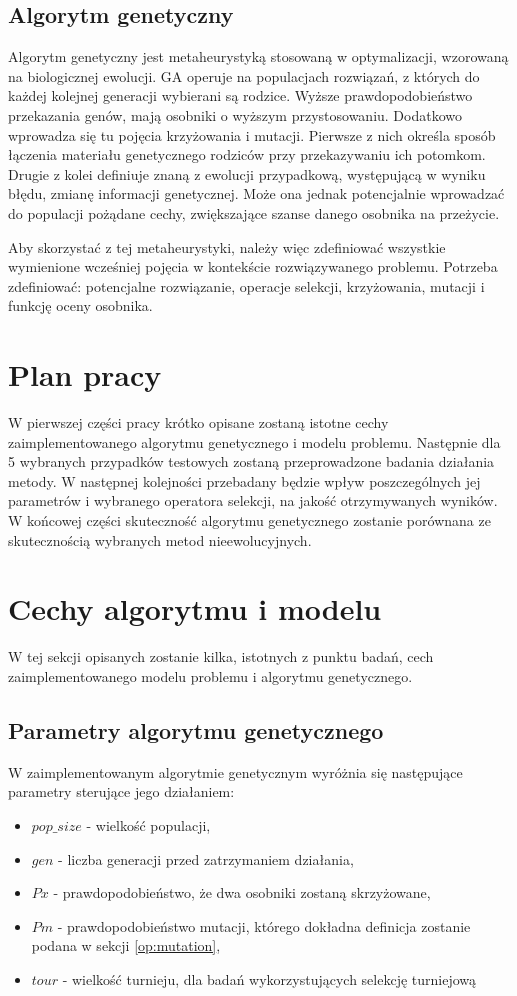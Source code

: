 \documentclass{article}
\begin{document}
	\subsection{Algorytm genetyczny}
	Algorytm genetyczny jest metaheurystyką stosowaną w optymalizacji, wzorowaną na biologicznej ewolucji. GA operuje na populacjach rozwiązań, z których do każdej kolejnej generacji wybierani są rodzice. Wyższe prawdopodobieństwo przekazania genów, mają osobniki o wyższym przystosowaniu. Dodatkowo wprowadza się tu pojęcia krzyżowania i mutacji. Pierwsze z nich określa sposób łączenia materiału genetycznego rodziców przy przekazywaniu ich potomkom. Drugie z kolei definiuje znaną z ewolucji przypadkową, występującą w wyniku błędu, zmianę informacji genetycznej.
	Może ona jednak potencjalnie wprowadzać do populacji pożądane cechy, zwiększające szanse danego osobnika na przeżycie. \par Aby skorzystać z tej metaheurystyki, należy więc zdefiniować wszystkie wymienione wcześniej pojęcia w kontekście rozwiązywanego problemu. Potrzeba zdefiniować: potencjalne rozwiązanie, operacje selekcji, krzyżowania, mutacji i funkcję oceny osobnika.
	
	\section{Plan pracy}
	W pierwszej części pracy krótko opisane zostaną istotne cechy zaimplementowanego algorytmu genetycznego i modelu problemu. Następnie dla 5 wybranych przypadków testowych zostaną przeprowadzone badania działania metody. W następnej kolejności przebadany będzie wpływ poszczególnych jej parametrów i wybranego operatora selekcji, na jakość otrzymywanych wyników. W końcowej części skuteczność algorytmu genetycznego zostanie porównana ze skutecznością wybranych metod nieewolucyjnych.
	
	\section{Cechy algorytmu i modelu}
	W tej sekcji opisanych zostanie kilka, istotnych z punktu badań, cech zaimplementowanego modelu problemu i algorytmu genetycznego.
	
	\subsection{Parametry algorytmu genetycznego}
	W zaimplementowanym algorytmie genetycznym wyróżnia się następujące parametry sterujące jego działaniem:
	\begin{itemize}
		\item $pop\_size$ - wielkość populacji,
		\item $gen$ - liczba generacji przed zatrzymaniem działania,
		\item $Px$ - prawdopodobieństwo, że dwa osobniki zostaną skrzyżowane,
		\item $Pm$ - prawdopodobieństwo mutacji, którego dokładna definicja zostanie podana w sekcji \ref{op:mutation},
		\item $tour$ - wielkość turnieju, dla badań wykorzystujących selekcję turniejową
	\end{itemize}
	
\end{document}

